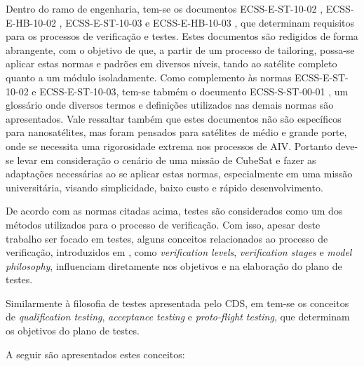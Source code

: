 Dentro do ramo de engenharia, tem-se os documentos ECSS-E-ST-10-02 \cite{ecss-e-st-10-02}, ECSS-E-HB-10-02 \cite{ecss-e-hb-10-02}, ECSS-E-ST-10-03 \cite{ecss-e-st-10-03} e ECSS-E-HB-10-03 \cite{ecss-e-hb-10-03}, que determinam requisitos para os processos de verificação e testes. Estes documentos são redigidos de forma abrangente, com o objetivo de que, a partir de um processo de tailoring, possa-se aplicar estas normas e padrões em diversos níveis, tando ao satélite completo quanto a um módulo isoladamente.
Como complemento às normas ECSS-E-ST-10-02 e ECSS-E-ST-10-03, tem-se tabmém o documento ECSS-S-ST-00-01 \cite{ecss-s-st-00-01}, um glossário onde diversos termos e definições utilizados nas demais normas são apresentados.
Vale ressaltar também que estes documentos não são específicos para nanosatélites, mas foram pensados para satélites de médio e grande porte, onde se necessita uma rigorosidade extrema nos processos de \gls{AIV}.
Portanto deve-se levar em consideração o cenário de uma missão de CubeSat e fazer as adaptações necessárias ao se aplicar estas normas, especialmente em uma missão universitária, visando simplicidade, baixo custo e rápido desenvolvimento.

De acordo com as normas citadas acima, testes são considerados como um dos métodos utilizados para o processo de verificação.
Com isso, apesar deste trabalho ser focado em testes, alguns conceitos relacionados ao processo de verificação, introduzidos em \cite{ecss-e-st-10-02}, como \textit{verification levels}, \textit{verification stages} e \textit{model philosophy}, influenciam diretamente nos objetivos e na elaboração do plano de testes.

Similarmente à filosofia de testes apresentada pelo \gls{CDS}, em \textcite{ecss-e-st-10-03} tem-se os conceitos de \textit{qualification testing}, \textit{acceptance testing} e \textit{proto-flight testing}, que determinam os objetivos do plano de testes.

A seguir são apresentados estes conceitos:

